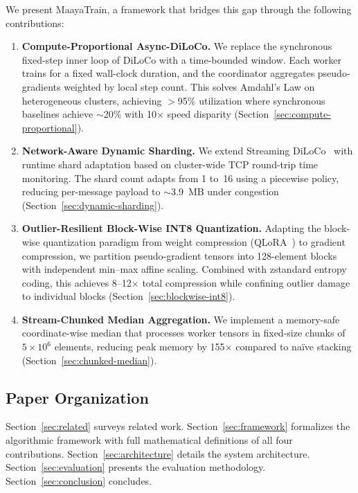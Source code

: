 \documentclass[10pt,conference]{IEEEtran}
\begin{document}
We present MaayaTrain, a framework that bridges this gap through the following
contributions:

\begin{enumerate}
  \item \textbf{Compute-Proportional Async-DiLoCo.} We replace the
    synchronous fixed-step inner loop of DiLoCo with a time-bounded window.
    Each worker trains for a fixed wall-clock duration, and the coordinator
    aggregates pseudo-gradients weighted by local step count. This solves
    Amdahl's Law on heterogeneous clusters, achieving $>$95\% utilization
    where synchronous baselines achieve $\sim$20\% with 10$\times$ speed
    disparity (Section~\ref{sec:compute-proportional}).

  \item \textbf{Network-Aware Dynamic Sharding.} We extend Streaming
    DiLoCo~\cite{douillard2025streaming} with runtime shard adaptation based
    on cluster-wide TCP round-trip time monitoring. The shard count adapts
    from 1 to~16 using a piecewise policy, reducing per-message payload to
    $\sim$3.9~MB under congestion (Section~\ref{sec:dynamic-sharding}).

  \item \textbf{Outlier-Resilient Block-Wise INT8 Quantization.} Adapting the
    block-wise quantization paradigm from weight compression
    (QLoRA~\cite{dettmers2023qlora}) to gradient compression, we partition
    pseudo-gradient tensors into 128-element blocks with independent
    min--max affine scaling. Combined with zstandard entropy coding, this
    achieves 8--12$\times$ total compression while confining outlier damage
    to individual blocks (Section~\ref{sec:blockwise-int8}).

  \item \textbf{Stream-Chunked Median Aggregation.} We implement a
    memory-safe coordinate-wise median that processes worker tensors in
    fixed-size chunks of $5{\times}10^6$ elements, reducing peak memory by
    155$\times$ compared to na\"ive stacking
    (Section~\ref{sec:chunked-median}).
\end{enumerate}

\subsection{Paper Organization}

Section~\ref{sec:related} surveys related work.
Section~\ref{sec:framework} formalizes the algorithmic framework with full
mathematical definitions of all four contributions.
Section~\ref{sec:architecture} details the system architecture.
Section~\ref{sec:evaluation} presents the evaluation methodology.
Section~\ref{sec:conclusion} concludes.
\end{document}

